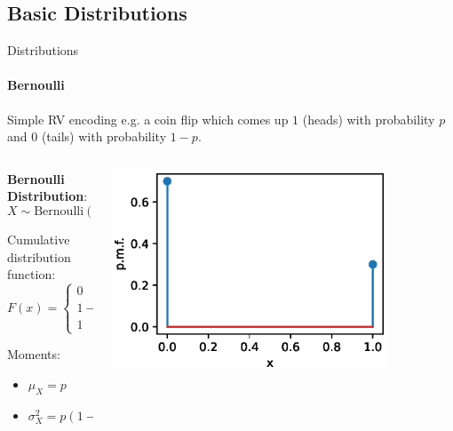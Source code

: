 {    \subsection{Basic Distributions}

    \begin{frame}{Distributions}
        \framesubtitle{Bernoulli}
        Simple RV encoding e.g. a coin flip which comes up $1$ (heads)
        with probability $p$ and $0$ (tails) with probability $1-p$.

        \vspace*{3mm}
        \begin{columns}[onlytextwidth]
            \begin{column}{0.5\textwidth}
                \begin{boxed}
                    \textbf{Bernoulli Distribution}:
                    $$X \sim \mathrm{Bernoulli}(p) $$

                    Cumulative distribution function:
                    $$F(x) = \begin{cases} 0 & x < 0, \\ 1-p & 0 \le x < 1, \\ 1 & x \geq 1 . \end{cases}$$

                    Moments:
                    \begin{itemize}
                        \item  $\mu_X = p$
                        \item $\sigma_X^2 = p(1-p)$
                    \end{itemize}
                \end{boxed}
            \end{column}
            \begin{column}{0.5\textwidth}
                \begin{center}
                    \includegraphics[width=0.8\textwidth]{fig/prob_dist_bernoulli.eps}
                \end{center}
            \end{column}
        \end{columns}
    \end{frame}

}
